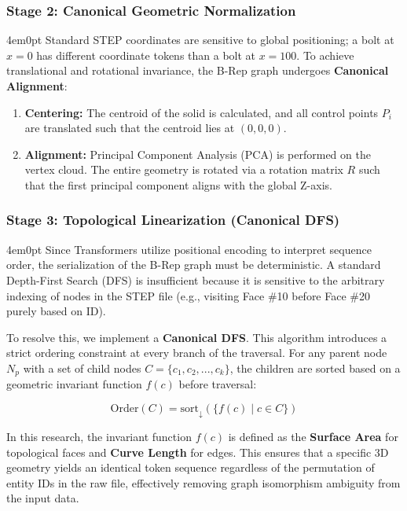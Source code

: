 	\subsubsection{Stage 2: Canonical Geometric Normalization}
	\begin{indentedblock}{4em}{0pt}
		Standard STEP coordinates are sensitive to global positioning; a bolt at $x=0$ has different coordinate tokens than a bolt at $x=100$. To achieve translational and rotational invariance, the B-Rep graph undergoes \textbf{Canonical Alignment}:
		\begin{enumerate}
			\item \textbf{Centering:} The centroid of the solid is calculated, and all control points $P_i$ are translated such that the centroid lies at $(0,0,0)$.
			\item \textbf{Alignment:} Principal Component Analysis (PCA) is performed on the vertex cloud. The entire geometry is rotated via a rotation matrix $R$ such that the first principal component aligns with the global Z-axis.
		\end{enumerate}
	\end{indentedblock}
	
	\subsubsection{Stage 3: Topological Linearization (Canonical DFS)}
		\begin{indentedblock}{4em}{0pt}
			Since Transformers utilize positional encoding to interpret sequence order, the serialization of the B-Rep graph must be deterministic. A standard Depth-First Search (DFS) is insufficient because it is sensitive to the arbitrary indexing of nodes in the STEP file (e.g., visiting Face \#10 before Face \#20 purely based on ID).
			
			To resolve this, we implement a \textbf{Canonical DFS}. This algorithm introduces a strict ordering constraint at every branch of the traversal. For any parent node $N_p$ with a set of child nodes $C = \{c_1, c_2, ..., c_k\}$, the children are sorted based on a geometric invariant function $f(c)$ before traversal:
			
			\begin{equation}
				\text{Order}(C) = \text{sort}_{\downarrow}\left( \{ f(c) \mid c \in C \} \right)
			\end{equation}
			
			In this research, the invariant function $f(c)$ is defined as the \textbf{Surface Area} for topological faces and \textbf{Curve Length} for edges. This ensures that a specific 3D geometry yields an identical token sequence regardless of the permutation of entity IDs in the raw file, effectively removing graph isomorphism ambiguity from the input data.
		\end{indentedblock}
	
